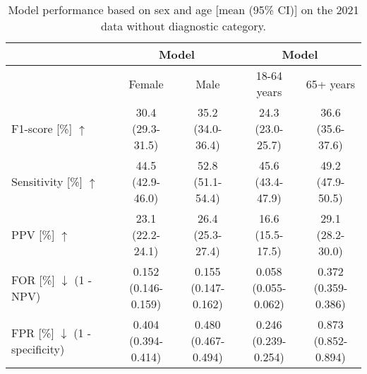 {\begin{table}[h]
\begin{tabular}{l|cc|cc}
        \bottomrule
    \end{tabular}%
\end{table}


\begin{table}[h]
    \centering
    \caption{Model performance based on sex and age [mean (95\% CI)] on the 2021 data without diagnostic category.}
    \label{tab_retrospective:tableA3}
    \begin{tabular}{l|cc|cc}
        \toprule

         & \multicolumn{2}{c|}{Model} & \multicolumn{2}{c}{Model} \\
        \midrule
         & Female & Male & 18-64 years & 65+ years \\

        \midrule

        F1-score [\%] $\uparrow$                                 & \makecell{30.4 \\ (29.3-31.5)} & \makecell{35.2 \\ (34.0-36.4)} & \makecell{24.3 \\ (23.0-25.7)} & \makecell{36.6 \\ (35.6-37.6)} \\
        \midrule
        Sensitivity [\%] $\uparrow$                              & \makecell{44.5 \\ (42.9-46.0)} & \makecell{52.8 \\ (51.1-54.4)} & \makecell{45.6 \\ (43.4-47.9)} & \makecell{49.2 \\ (47.9-50.5)} \\
        \midrule
        PPV [\%] $\uparrow$                                      & \makecell{23.1 \\ (22.2-24.1)} & \makecell{26.4 \\ (25.3-27.4)} & \makecell{16.6 \\ (15.5-17.5)} & \makecell{29.1 \\ (28.2-30.0)} \\
        \midrule
        \makecell[l]{FOR [\%] $\downarrow$ \\ (1 - NPV)}         & \makecell{0.152 \\ (0.146-0.159)} & \makecell{0.155 \\ (0.147-0.162)} & \makecell{0.058 \\ (0.055-0.062)} & \makecell{0.372 \\ (0.359-0.386)} \\
        \midrule
        \makecell[l]{FPR [\%] $\downarrow$ \\ (1 - specificity)} & \makecell{0.404 \\ (0.394-0.414)} & \makecell{0.480 \\ (0.467-0.494)} & \makecell{0.246 \\ (0.239-0.254)} & \makecell{0.873 \\ (0.852-0.894)} \\


\end{tabular}
\end{table}}
